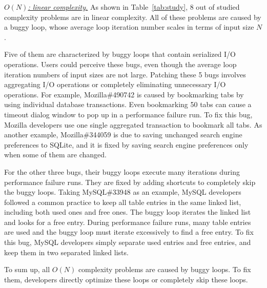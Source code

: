 {\underline{\textit{$O(N)$: linear complexity.}}} 
As shown in Table~\ref{tab:study}, 
8 out of \ComBugs studied complexity problems are in linear complexity. 
All of these problems are caused by a buggy loop, 
whose average loop iteration number scales in terms of input size $N$.

Five of them are characterized by buggy loops that contain serialized I/O operations.
Users could perceive these bugs, 
even though the average loop iteration numbers of input sizes are not large.
Patching these 5 bugs involves aggregating I/O operations 
or completely eliminating unnecessary I/O operations. 
For example, Mozilla\#490742 is caused by bookmarking 
tabs by using individual database transactions. 
Even bookmarking 50 tabs can cause a timeout dialog 
window to pop up in a performance failure run. 
To fix this bug, Mozilla developers use one single aggregated transaction 
to bookmark all tabs.
As another example, Mozilla\#344059 is due to saving unchanged 
search engine preferences to SQLite, 
and it is fixed by saving search 
engine preferences only when some of them are changed.


For the other three bugs,
their buggy loops execute many iterations during performance failure runs.
They are fixed by adding shortcuts to completely skip the buggy loops. 
Taking MySQL\#33948 as an example,
MySQL developers followed a common practice to keep all table entries in the same linked list, 
including both used ones and free ones. 
The buggy loop iterates the linked list and looks for a free entry.
During performance failure runs, 
many table entries are used and the buggy loop must iterate excessively to find a free entry.
To fix this bug, MySQL developers simply separate used entries and free entries,
and keep them in two separated linked lists. 

To sum up, all $O(N)$ complexity problems are caused by buggy loops. 
To fix them, developers directly optimize these loops or completely skip these loops. 





